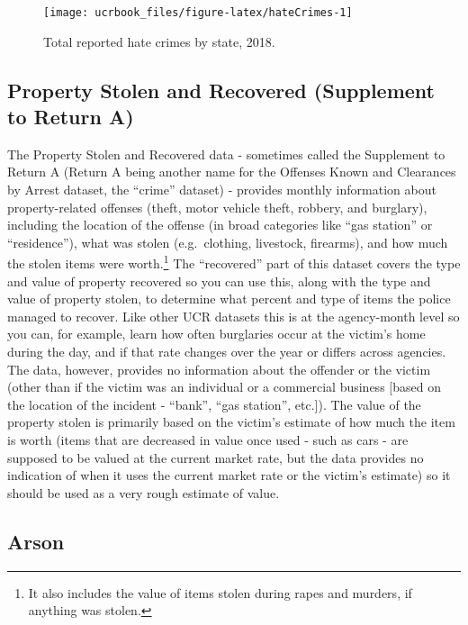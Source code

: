 \documentclass[
  12pt,
  openany]{book}
\begin{document}
\begin{figure}

{\centering \texttt{[image: ucrbook\_files/figure-latex/hateCrimes-1]} 

}

\caption{Total reported hate crimes by state, 2018.}\label{fig:hateCrimes}
\end{figure}

\hypertarget{property-stolen-and-recovered-supplement-to-return-a}{%
\subsection{Property Stolen and Recovered (Supplement to Return A)}\label{property-stolen-and-recovered-supplement-to-return-a}}

The Property Stolen and Recovered data - sometimes called the Supplement to Return A (Return A being another name for the Offenses Known and Clearances by Arrest dataset, the ``crime'' dataset) - provides monthly information about property-related offenses (theft, motor vehicle theft, robbery, and burglary), including the location of the offense (in broad categories like ``gas station'' or ``residence''), what was stolen (e.g.~clothing, livestock, firearms), and how much the stolen items were worth.\footnote{It also includes the value of items stolen during rapes and murders, if anything was stolen.} The ``recovered'' part of this dataset covers the type and value of property recovered so you can use this, along with the type and value of property stolen, to determine what percent and type of items the police managed to recover. Like other UCR datasets this is at the agency-month level so you can, for example, learn how often burglaries occur at the victim's home during the day, and if that rate changes over the year or differs across agencies. The data, however, provides no information about the offender or the victim (other than if the victim was an individual or a commercial business {[}based on the location of the incident - ``bank'', ``gas station'', etc.{]}). The value of the property stolen is primarily based on the victim's estimate of how much the item is worth (items that are decreased in value once used - such as cars - are supposed to be valued at the current market rate, but the data provides no indication of when it uses the current market rate or the victim's estimate) so it should be used as a very rough estimate of value.

\hypertarget{arson}{%
\subsection{Arson}\label{arson}}
\end{document}
